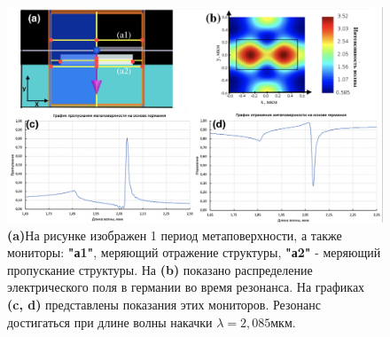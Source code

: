 \begin{figure}[h]
	\centering
    \includegraphics[width=0.9\linewidth]{images/expert.png}
	\caption{\textbf{(a)}На рисунке изображен 1 период метаповерхности, а также мониторы:  \textbf{"а1"}, меряющий отражение структуры, \textbf{"а2"} - меряющий пропускание структуры.  На \textbf{(b)} показано распределение электрического поля в германии во время резонанса. На графиках \textbf{ (c, d)} представлены показания этих мониторов. Резонанс достигаться при длине волны накачки $\lambda = 2,085$мкм.}
	\label{base2}
\end{figure}


